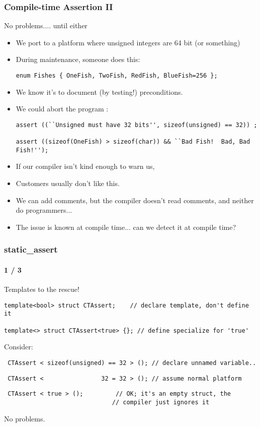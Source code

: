 \begin{frame}[fragile,t]
\frametitle{Compile-time Assertion II}


No problems.... until either


\begin{itemize}[<+->]
\item We port to a platform where unsigned integers are 64 bit (or
  something)
\item During maintenance, someone does this:
{\scriptsize\begin{verbatim}
enum Fishes { OneFish, TwoFish, RedFish, BlueFish=256 };
\end{verbatim}
}

\item We know it's  to document (by testing!)
  preconditions.
\item We could abort the program :
{\scriptsize\begin{verbatim}
assert ((``Unsigned must have 32 bits'', sizeof(unsigned) == 32)) ;

assert ((sizeof(OneFish) > sizeof(char)) && ``Bad Fish!  Bad, Bad Fish!'');
\end{verbatim}
}
\item If our compiler isn't kind enough to warn us, 
\item Customers usually don't like this.
\item We can add comments, but the compiler doesn't read comments, and
  neither do programmers...
\item The issue is known at compile time... can we detect it at
  compile time?
\end{itemize}


\end{frame}


\begin{frame}[fragile,t]
\frametitle{static\_assert}
\framesubtitle{1 / 3}
Templates to the rescue!
{\scriptsize\begin{verbatim}
template<bool> struct CTAssert;    // declare template, don't define it

template<> struct CTAssert<true> {}; // define specialize for 'true'
\end{verbatim}
}

\pause
Consider:
{\scriptsize\begin{verbatim}
 CTAssert < sizeof(unsigned) == 32 > (); // declare unnamed variable..
\end{verbatim}
}
\pause
{\scriptsize\begin{verbatim}
 CTAssert <                32 = 32 > (); // assume normal platform
\end{verbatim}
}
\pause
{\scriptsize\begin{verbatim}
 CTAssert < true > ();         // OK; it's an empty struct, the
                              // compiler just ignores it
\end{verbatim}
}

No problems.

\end{frame}

